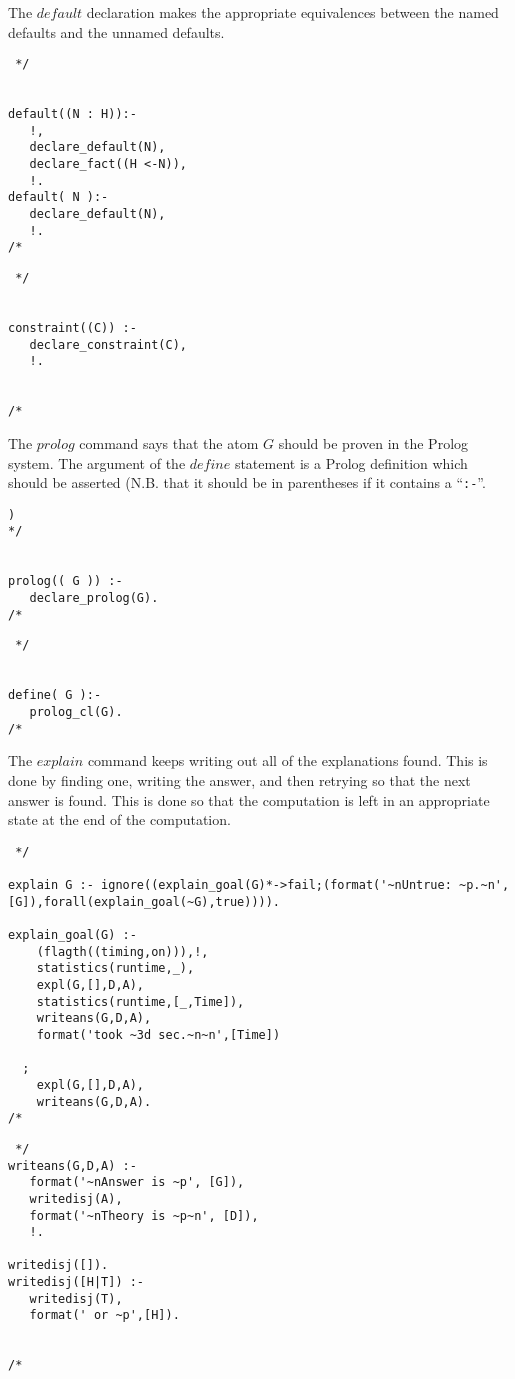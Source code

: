 The $default$ declaration makes the appropriate equivalences between the
named defaults and the unnamed defaults.
\begin{verbatim} */


default((N : H)):-
   !,
   declare_default(N),
   declare_fact((H <-N)),
   !.
default( N ):-
   declare_default(N),
   !.
/* \end{verbatim}
\begin{verbatim} */


constraint((C)) :-
   declare_constraint(C),
   !.

                       
/* \end{verbatim}
The $prolog$ command says that the atom $G$ should be proven in the
Prolog system. The argument of the $define$ statement is a Prolog
definition which should be asserted (N.B. that it should be in
parentheses if it contains a ``{\tt :-}''.
\begin{verbatim} 
)
*/

                                   
prolog(( G )) :-
   declare_prolog(G).
/* \end{verbatim}
\begin{verbatim} */


define( G ):-
   prolog_cl(G).
/* \end{verbatim}

The $explain$ command keeps writing out all of the explanations found.
This is done by finding one, writing the answer, and then retrying so that
the next answer is found. This is done so that the computation is left in
an appropriate state at the end of the computation.
\begin{verbatim} */

explain G :- ignore((explain_goal(G)*->fail;(format('~nUntrue: ~p.~n',[G]),forall(explain_goal(~G),true)))).

explain_goal(G) :-
    (flagth((timing,on))),!,
    statistics(runtime,_),
    expl(G,[],D,A),
    statistics(runtime,[_,Time]),
    writeans(G,D,A),
    format('took ~3d sec.~n~n',[Time])
    
  ;
    expl(G,[],D,A),
    writeans(G,D,A).
/* \end{verbatim}
\begin{verbatim} */
writeans(G,D,A) :-
   format('~nAnswer is ~p', [G]),
   writedisj(A),
   format('~nTheory is ~p~n', [D]),
   !.

writedisj([]).
writedisj([H|T]) :-
   writedisj(T),
   format(' or ~p',[H]).


/* \end{verbatim}

